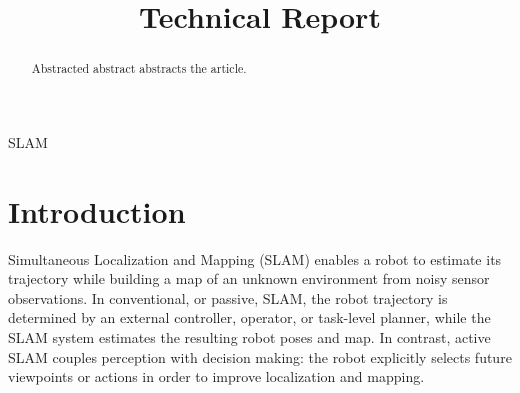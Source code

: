 \documentclass[conference]{IEEEtran}
\begin{document}
\title{Technical Report}

\author{
\and
{}
}

\maketitle

\maketitle

\begin{abstract}
Abstracted abstract abstracts the article.
\end{abstract}

\begin{IEEEkeywords}
SLAM
\end{IEEEkeywords}

\section{Introduction}

Simultaneous Localization and Mapping (SLAM) enables a robot to estimate its trajectory while building a map of an unknown environment from noisy sensor observations. In conventional, or passive, SLAM, the robot trajectory is determined by an external controller, operator, or task-level planner, while the SLAM system estimates the resulting robot poses and map. In contrast, active SLAM couples perception with decision making: the robot explicitly selects future viewpoints or actions in order to improve localization and mapping.
\end{document}
